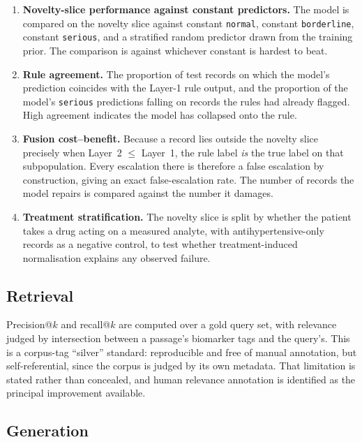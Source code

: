 \documentclass[11pt,a4paper]{article}
\begin{document}
\begin{enumerate}[leftmargin=*]
  \item \textbf{Novelty-slice performance against constant predictors.} The model is
    compared on the novelty slice against constant \texttt{normal}, constant
    \texttt{borderline}, constant \texttt{serious}, and a stratified random
    predictor drawn from the training prior. The comparison is against whichever
    constant is hardest to beat.
  \item \textbf{Rule agreement.} The proportion of test records on which the model's
    prediction coincides with the Layer-1 rule output, and the proportion of the
    model's \texttt{serious} predictions falling on records the rules had already
    flagged. High agreement indicates the model has collapsed onto the rule.
  \item \textbf{Fusion cost--benefit.} Because a record lies outside the novelty
    slice precisely when Layer~2 $\le$ Layer~1, the rule label \emph{is} the true
    label on that subpopulation. Every escalation there is therefore a false
    escalation by construction, giving an exact false-escalation rate. The number of
    records the model repairs is compared against the number it damages.
  \item \textbf{Treatment stratification.} The novelty slice is split by whether the
    patient takes a drug acting on a measured analyte, with antihypertensive-only
    records as a negative control, to test whether treatment-induced normalisation
    explains any observed failure.
\end{enumerate}

\subsection{Retrieval}

Precision@$k$ and recall@$k$ are computed over a gold query set, with relevance
judged by intersection between a passage's biomarker tags and the query's. This is
a corpus-tag ``silver'' standard: reproducible and free of manual annotation, but
self-referential, since the corpus is judged by its own metadata. That limitation
is stated rather than concealed, and human relevance annotation is identified as
the principal improvement available.

\subsection{Generation}
\end{document}
